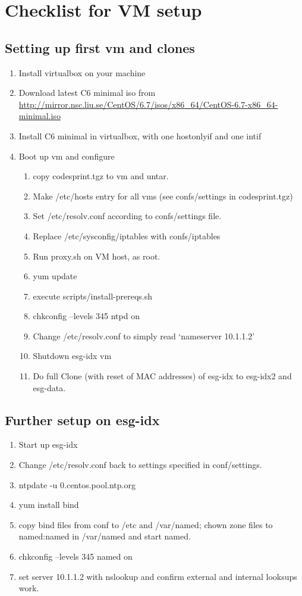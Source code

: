 \documentclass[12pt,oneside]{memoir}
\begin{document}
\chapter{Checklist for VM setup}
\section{Setting up first vm and clones}
\begin{enumerate}
\item Install virtualbox on your machine
\item Download latest C6 minimal iso from \\
\url{http://mirror.nsc.liu.se/CentOS/6.7/isos/x86_64/CentOS-6.7-x86_64-minimal.iso}
\item Install C6 minimal in virtualbox, with one hostonlyif and one intif
\item Boot up vm and configure
\begin{enumerate}
\item copy codesprint.tgz to vm and untar. 
\item Make /etc/hosts entry for all vms (see confs/settings in codesprint.tgz)
\item Set /etc/resolv.conf according to confs/settings file.
\item Replace /etc/sysconfig/iptables with confs/iptables
\item Run proxy.sh on VM host, as root.
\item yum update 
\item execute scripts/install-prereqs.sh
\item chkconfig --levels 345 ntpd on
\item Change /etc/resolv.conf to simply read `nameserver 10.1.1.2'
\item Shutdown esg-idx vm
\item Do full Clone (with reset of MAC addresses) of esg-idx to esg-idx2 and esg-data.
\end{enumerate}
\end{enumerate}
\section{Further setup on esg-idx}
\begin{enumerate}
\item Start up esg-idx
\item Change /etc/resolv.conf back to settings specified in conf/settings.
\item ntpdate -u 0.centos.pool.ntp.org
\item yum install bind
\item copy bind files from conf to /etc and /var/named; chown zone files to named:named in /var/named and start named.
\item chkconfig --levels 345 named on
\item set server 10.1.1.2 with nslookup and confirm external and internal looksups work.
\end{enumerate}
\end{document}
